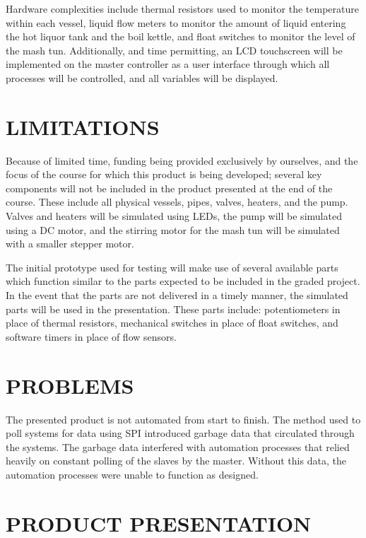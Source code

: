 \documentclass[letterpaper, 10 pt, conference]{ieeeconf}  %
\begin{document}
Hardware complexities include thermal resistors used to monitor the temperature within each vessel, liquid flow meters to monitor the amount of liquid entering the hot liquor tank and the boil kettle, and float switches to monitor the level of the mash tun. Additionally, and time permitting, an LCD touchscreen will be implemented on the master controller as a user interface through which all processes will be controlled, and all variables will be displayed.

\section{LIMITATIONS}

Because of limited time, funding being provided exclusively by ourselves, and the focus of the course for which this product is being developed; several key components will not be included in the product presented at the end of the course. These include all physical vessels, pipes, valves, heaters, and the pump. Valves and heaters will be simulated using LEDs, the pump will be simulated using a DC motor, and the stirring motor for the mash tun will be simulated with a smaller stepper motor.

The initial prototype used for testing will make use of several available parts which function similar to the parts expected to be included in the graded project. In the event that the parts are not delivered in a timely manner, the simulated parts will be used in the presentation. These parts include: potentiometers in place of thermal resistors, mechanical switches in place of float switches, and software timers in place of flow sensors.

\section{PROBLEMS}

The presented product is not automated from start to finish. The method used to poll systems for data using SPI introduced garbage data that circulated through the systems. The garbage data interfered with automation processes that relied heavily on constant polling of the slaves by the master. Without this data, the automation processes were unable to function as designed.

\section{PRODUCT PRESENTATION}
\end{document}
